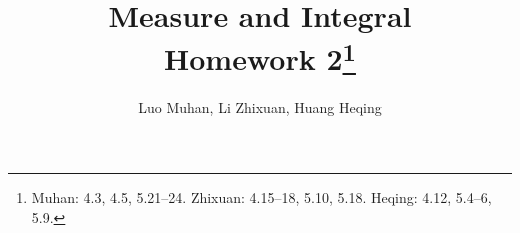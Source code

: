 \documentclass[11pt]{article}
\theoremstyle{definition}
\begin{document}
  \title{\textbf{Measure and Integral}\\ Homework 2\footnote{
    Muhan: 4.3, 4.5, 5.21--24.
    Zhixuan: 4.15--18, 5.10, 5.18.
    Heqing: 4.12, 5.4--6, 5.9. }}
  \author{Luo Muhan, Li Zhixuan, Huang Heqing}
  \maketitle

%
%  
%
%  

%  
  \setcounter{section}{3}
  
  
\end{document}
